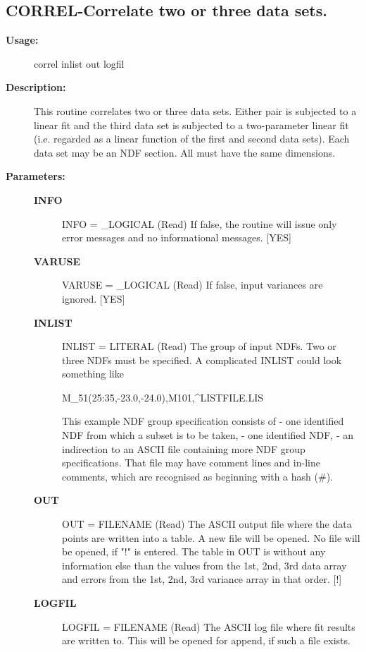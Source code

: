 \subsection{CORREL-\label{CORREL}Correlate two or three data sets.}
\begin{description}

\item [{\bf Usage:}]

   correl inlist out logfil


\item [{\bf Description:}]

   This routine correlates two or three data sets. Either pair is
   subjected to a linear fit and the third data set is subjected to a
   two-parameter linear fit (i.e. regarded as a linear function of
   the first and second data sets). Each data set may be an NDF
   section. All must have the same dimensions.

\item [{\bf Parameters:}]
\begin{description}
\item [{\bf INFO}]
INFO = _LOGICAL (Read)
   If false, the routine will issue only error messages and no
   informational messages. [YES]
\item [{\bf VARUSE}]
VARUSE = _LOGICAL (Read)
   If false, input variances are ignored. [YES]
\item [{\bf INLIST}]
INLIST = LITERAL (Read)
   The group of input NDFs. Two or three NDFs must be specified.
   A complicated INLIST could look something like

   M_51(25:35,-23.0,-24.0),M101,^LISTFILE.LIS

   This example NDF group specification consists of
   -  one identified NDF from which a subset is to be taken,
   -  one identified NDF,
   -  an indirection to an ASCII file containing more NDF group
      specifications. That file may have comment lines and in-line
      comments, which are recognised as beginning with a hash (#).
\item [{\bf OUT}]
OUT = FILENAME (Read)
   The ASCII output file where the data points are written into a
   table. A new file will be opened. No file will be opened, if
   "!" is entered.
   The table in OUT is without any information else than the
   values from the 1st, 2nd, 3rd data array and errors from the
   1st, 2nd, 3rd variance array in that order. [!]
\item [{\bf LOGFIL}]
LOGFIL = FILENAME (Read)
   The ASCII log file where fit results are written to. This will
   be opened for append, if such a file exists.
\end{description}

\end{description}
